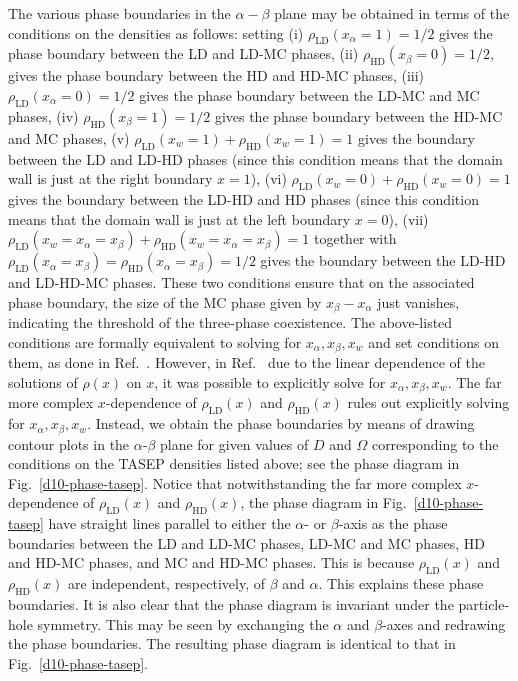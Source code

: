 \documentclass[aps,pre,twocolumn,superscriptaddress,amsmath,amssymb,longbibliography,floatfix,nofootinbib]{revtex4}
\begin{document}
{The various phase boundaries in the $\alpha-\beta$ plane may be obtained in terms of the conditions on the densities as follows: setting (i) $\rho_\text{LD}(x_\alpha=1)=1/2$ gives the phase boundary between the LD and LD-MC phases, (ii) $\rho_\text{HD}(x_\beta=0)=1/2$, gives the phase boundary between the HD and HD-MC phases, (iii) $\rho_\text{LD}(x_\alpha=0)=1/2$ gives the phase boundary between the LD-MC and MC phases, (iv) $\rho_\text{HD}(x_\beta=1)=1/2$ gives the phase boundary between the HD-MC and MC phases, (v) $\rho_\text{LD}(x_w=1)+\rho_\text{HD}(x_w=1)=1$ gives the boundary between the LD and LD-HD phases (since this condition means that the domain wall is just at the right boundary $x=1$), (vi) $\rho_\text{LD}(x_w=0)+\rho_\text{HD}(x_w=0)=1$ gives the boundary between the LD-HD and HD phases (since this condition means that the domain wall is just at the left boundary $x=0$), (vii)  $\rho_\text{LD}(x_w=x_\alpha=x_\beta)+\rho_\text{HD}(x_w=x_\alpha=x_\beta)=1$ together with $\rho_\text{LD}(x_\alpha=x_\beta)=\rho_\text{HD}(x_\alpha=x_\beta)=1/2$ gives the boundary between the LD-HD and LD-HD-MC phases. These two conditions ensure that on the associated phase boundary, the size of the MC phase given by $x_\beta-x_\alpha$ just vanishes, indicating the threshold of the three-phase coexistence. The above-listed conditions are formally equivalent to solving for $x_\alpha,x_\beta,x_w$ and set conditions on them, as done in Ref.~\cite{frey-lktasep}. However, in Ref.~\cite{frey-lktasep} due to the linear dependence of the solutions of $\rho(x)$ on $x$, it was possible to explicitly solve for $x_\alpha,x_\beta,x_w$. The far more complex $x$-dependence of $\rho_\text{LD}(x)$ and $\rho_\text{HD}(x)$ rules out explicitly solving for $x_\alpha,x_\beta,x_w$. Instead, we obtain the phase boundaries by means of drawing contour plots in the  $\alpha$-$\beta$ plane for given values of $D$ and $\Omega$ corresponding to the conditions on the TASEP densities listed above; see the phase diagram in Fig.~\ref{d10-phase-tasep}. Notice that notwithstanding the far more complex $x$-dependence of $\rho_\text{LD}(x)$ and $\rho_\text{HD}(x)$, the phase diagram in Fig.~\ref{d10-phase-tasep} have straight lines parallel to either the $\alpha$- or $\beta$-axis as the phase boundaries between the LD and LD-MC phases, LD-MC and MC phases, HD and HD-MC phases, and MC and HD-MC phases. This is because $\rho_\text{LD}(x)$ and $\rho_\text{HD}(x)$ are independent, respectively, of $\beta$ and $\alpha$. This explains these phase boundaries. It is also clear that the phase diagram is invariant under the particle-hole symmetry. This may be seen by exchanging the $\alpha$ and $\beta$-axes and redrawing the phase boundaries. The resulting phase diagram is identical to that in Fig.~\ref{d10-phase-tasep}.

}
\end{document}
